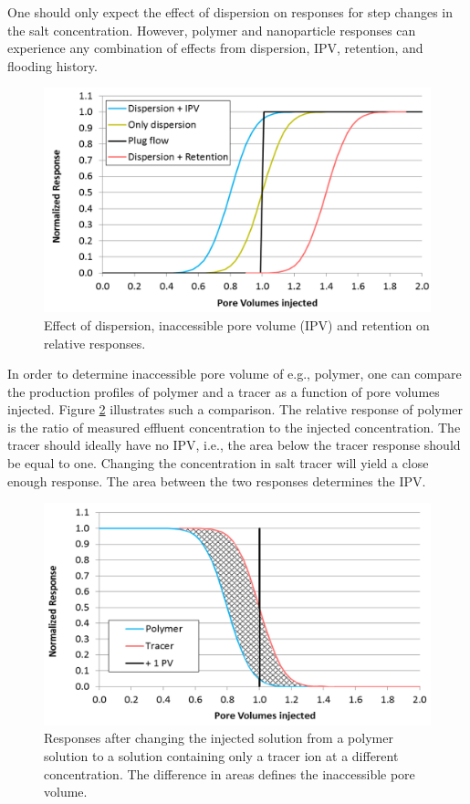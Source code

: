 One should only expect the effect of dispersion on responses for step changes in the salt concentration. However, polymer and nanoparticle responses can experience any combination of effects from dispersion, IPV, retention, and flooding history.

\begin{figure}[h!]
    \centering
    \includegraphics[width=\textwidth]{img/fig/ipvRet1.png}
    \caption{Effect of dispersion, inaccessible pore volume (IPV) and retention on relative responses.}
    \label{fig:ipvRet1} %
\end{figure}

In order to determine inaccessible pore volume  of e.g., polymer, one can compare the production profiles of polymer and a tracer as a function of pore volumes injected. Figure \ref{fig:ipvRet2} illustrates such a comparison. The relative response of polymer is the ratio of measured effluent concentration to the injected concentration. The tracer should ideally have no IPV, i.e., the area below the tracer response should be equal to one. Changing the concentration in salt tracer will yield a close enough response. The area between the two responses determines the IPV.

\begin{figure}[h!]
    \centering
    \includegraphics[width=\textwidth]{img/fig/ipvRet2.png}
    \caption{Responses after changing the injected solution from a polymer solution to a solution containing only a tracer ion at a different concentration. The difference in areas defines the inaccessible pore volume.}
    \label{fig:ipvRet2} %
\end{figure}

